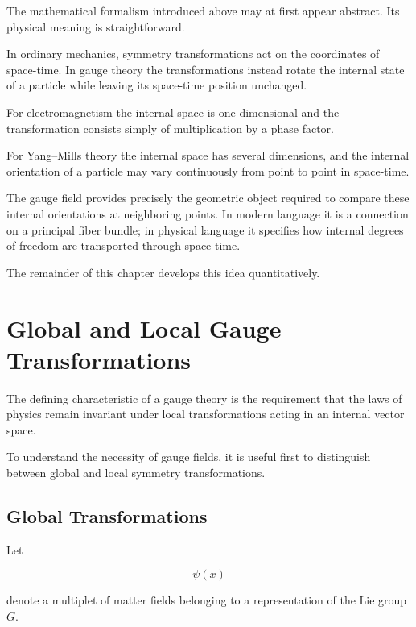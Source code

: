 The mathematical formalism introduced above may at first appear
abstract. Its physical meaning is straightforward.

In ordinary mechanics, symmetry transformations act on the coordinates
of space-time. In gauge theory the transformations instead rotate the
internal state of a particle while leaving its space-time position
unchanged.

For electromagnetism the internal space is one-dimensional and the
transformation consists simply of multiplication by a phase factor.

For Yang--Mills theory the internal space has several dimensions, and
the internal orientation of a particle may vary continuously from point
to point in space-time.

The gauge field provides precisely the geometric object required to
compare these internal orientations at neighboring points. In modern
language it is a connection on a principal fiber bundle; in physical
language it specifies how internal degrees of freedom are transported
through space-time.

The remainder of this chapter develops this idea quantitatively.



\section{Global and Local Gauge Transformations}

The defining characteristic of a gauge theory is the requirement that
the laws of physics remain invariant under local transformations acting
in an internal vector space.

To understand the necessity of gauge fields, it is useful first to
distinguish between global and local symmetry transformations.


\subsection{Global Transformations}

Let

\[
\psi(x)
\]

denote a multiplet of matter fields belonging to a representation of the
Lie group \(G\).

